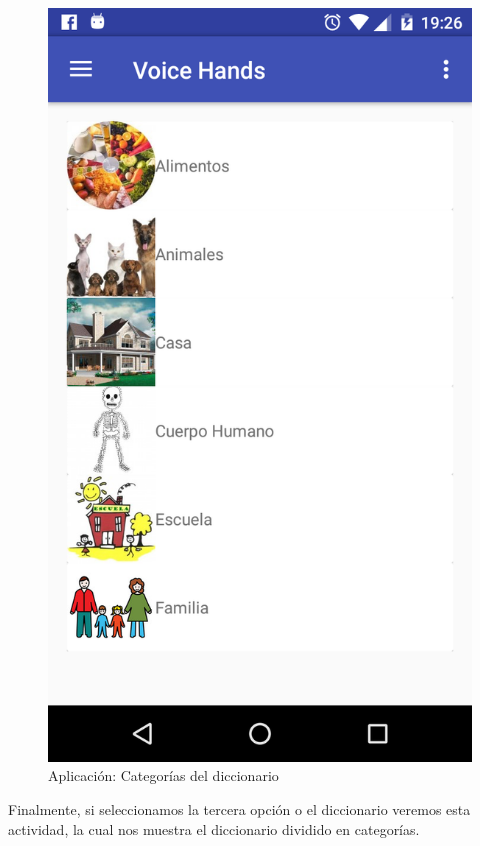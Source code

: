 \begin{figure}[H]
	\centering
	\includegraphics[scale = 0.2]{figures/app09}
	\caption{Aplicación: Categorías del diccionario}
	\label{fig:app09}
\end{figure}

Finalmente, si seleccionamos la tercera opción o el diccionario veremos esta actividad, la cual nos muestra el diccionario dividido en categorías.

